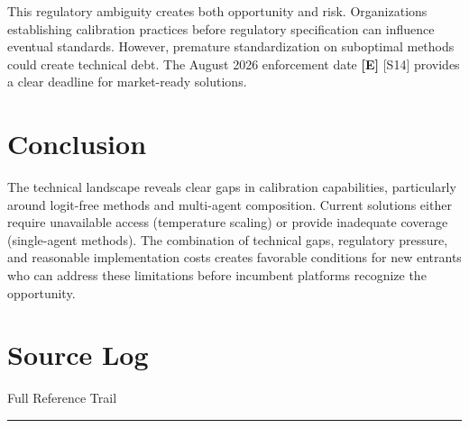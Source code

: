 \documentclass[a4paper,11pt]{article}
\newcommand{\ssubtitle}[1]{%
  \par\textcolor{subtitle}{\fontsize{12}{16}\selectfont #1}%
  \par\vspace{2pt}\textcolor{border}{\rule{\linewidth}{0.4pt}}\vspace{12pt}%
}
\newcommand{\elabel}{\textbf{\textcolor{ecolor}{[E]}}}
\begin{document}
This regulatory ambiguity creates both opportunity and risk. Organizations establishing calibration practices before regulatory specification can influence eventual standards. However, premature standardization on suboptimal methods could create technical debt. The August 2026 enforcement date \elabel{} \textcolor{primary}{[S14]} provides a clear deadline for market-ready solutions.


\section{Conclusion}

The technical landscape reveals clear gaps in calibration capabilities, particularly around logit-free methods and multi-agent composition. Current solutions either require unavailable access (temperature scaling) or provide inadequate coverage (single-agent methods). The combination of technical gaps, regulatory pressure, and reasonable implementation costs creates favorable conditions for new entrants who can address these limitations before incumbent platforms recognize the opportunity.

\clearpage
\section{Source Log}
\ssubtitle{Full Reference Trail}
\end{document}
